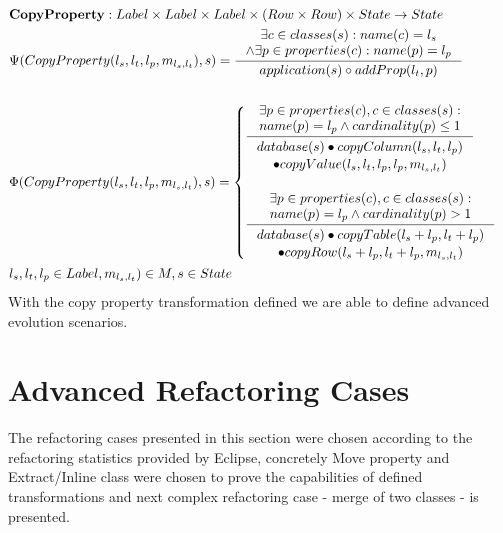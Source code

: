 \documentclass[11pt]{article}
\begin{document}
\begin{align*}
&	\mathbf{CopyProperty} : Label \times Label \times Label \times (Row \times Row) \times State \rightarrow State \\
&	\Psi(CopyProperty(l_s, l_t, l_p, m_{l_s, l_t}), s) = \inference{\exists c \in classes(s) : name(c) = l_s \\ \wedge \exists p \in properties(c) : name(p) = l_p }{application(s) \circ addProp(l_t, p)} 
	\\\\
&	\Phi(CopyProperty(l_s, l_t, l_p, m_{l_s, l_t}), s) = \begin{cases}
		\inference{\exists p \in properties(c), c \in classes(s) : \\ name(p) = l_p \wedge cardinality(p) \leq 1 }{\begin{gathered}
			database(s) \bullet copyColumn(l_s, l_t, l_p) \\ \bullet copyValue(l_s, l_t, l_p, l_p, m_{l_s, l_t}) 
			\end{gathered}} \\ \\
		\inference{\exists p \in properties(c), c \in classes(s) : \\ name(p) = l_p \wedge cardinality(p) > 1}{\begin{gathered}
			database(s) \bullet copyTable(l_s + l_p, l_t + l_p) \\ \bullet copyRow(l_s + l_p, l_t + l_p, m_{l_s, l_t}) 
			\end{gathered}}
 \end{cases}\\
& l_s, l_t, l_p \in Label,  m_{l_s, l_t}) \in M, s \in State
\end{align*}
With the copy property transformation defined we are able to define advanced evolution scenarios.


\section{Advanced Refactoring Cases}
The refactoring cases presented in this section were chosen according to the refactoring statistics provided by Eclipse, concretely Move property and Extract/Inline class were chosen to prove the capabilities of defined transformations and next complex refactoring case - merge of two classes - is presented.
\end{document}
